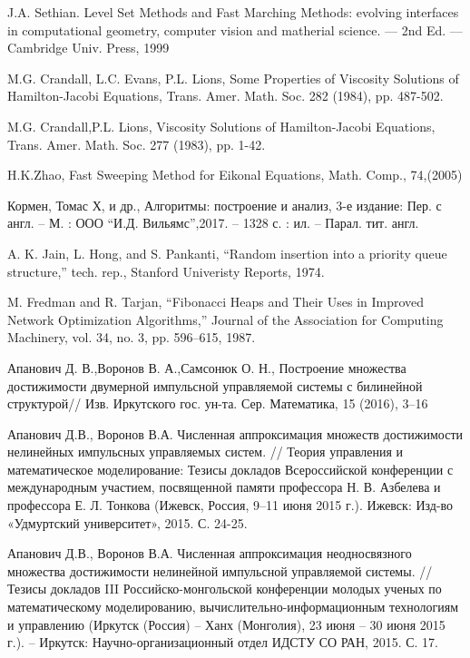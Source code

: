 \pagebreak
\begin{thebibliography}{99}

 {J.A. Sethian.} Level Set Methods and Fast Marching Methods: evolving
  interfaces in computational geometry, computer vision and matherial
  science. — 2nd Ed. — Cambridge Univ. Press, 1999

 {M.G. Crandall, L.C. Evans, P.L. Lions}, Some
  Properties of Viscosity Solutions of Hamilton-Jacobi Equations,
  Trans. Amer. Math. Soc. 282 (1984), pp. 487-502.

 {M.G. Crandall,P.L. Lions}, Viscosity Solutions of
  Hamilton-Jacobi Equations, Trans. Amer. Math. Soc. 277 (1983),
  pp. 1-42.

 {H.K.Zhao}, Fast Sweeping Method for Eikonal Equations, Math. Comp.,
74,(2005)

 {Кормен, Томас Х, и др.}, Алгоритмы: построение и
  анализ, 3-е издание: Пер. с англ. -- М. : ООО
  ``И.Д. Вильямс'',2017. -- 1328 с. : ил. -- Парал. тит. англ.

 {A. K. Jain, L. Hong, and S. Pankanti}, “Random insertion into a priority queue
structure,” tech. rep., Stanford Univeristy Reports, 1974.


 {M. Fredman and R. Tarjan}, “Fibonacci Heaps and Their Uses in Improved
Network Optimization Algorithms,” Journal of the Association for Computing
Machinery, vol. 34, no. 3, pp. 596–615, 1987.

  
 {Апанович Д. В.,Воронов В. А.,Самсонюк О. Н.},
  Построение множества достижимости двумерной импульсной управляемой
  системы с билинейной структурой// Изв. Иркутского
  гос. ун-та. Сер. Математика, 15 (2016), 3–16

 Апанович Д.В., Воронов В.А. Численная аппроксимация
  множеств достижимости нелинейных импульсных управляемых систем. //
  Теория управления и математическое моделирование: Тезисы докладов
  Всероссийской конференции с международным участием, посвященной
  памяти профессора Н. В. Азбелева и профессора Е. Л. Тонкова (Ижевск,
  Россия, 9–11 июня 2015 г.). Ижевск: Изд-во «Удмуртский университет»,
  2015. С. 24-25.

 Апанович Д.В., Воронов В.А. Численная аппроксимация
  неодносвязного множества достижимости нелинейной импульсной
  управляемой системы. //  Тезисы докладов III Российско-монгольской
  конференции молодых ученых по математическому моделированию,
  вычислительно-информационным технологиям и управлению (Иркутск
  (Россия) – Ханх (Монголия), 23 июня – 30 июня 2015 г.). – Иркутск:
  Научно-организационный отдел ИДСТУ СО РАН, 2015. С. 17.


\end{thebibliography}
